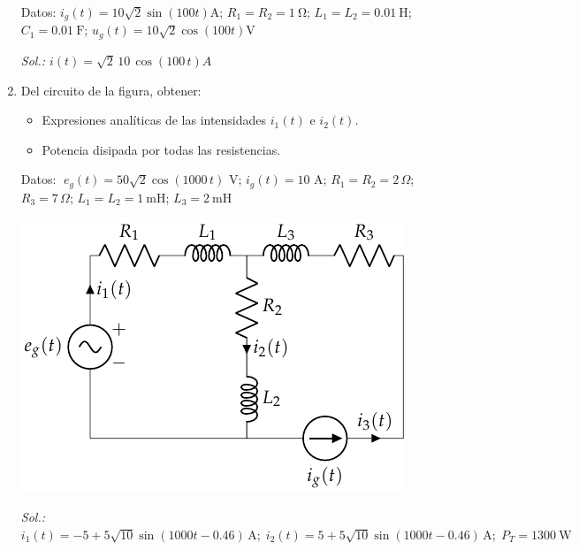 \begin{enumerate}
Datos: $i_g(t) = 10\sqrt{2}\sin(100t)\unit{\ampere}$; $R_1 = R_2 = \qty{1}{\ohm}$; $L_1 = L_2 = \qty{0.01}{\henry}$; $C_1 = \qty{0.01}{\farad}$; $u_g(t) = 10\sqrt{2}\cos(100t)\unit{\volt}$


  \emph{Sol.: $i(t)=\sqrt{2}\,10\,\cos(100\,t) A$}

\item Del circuito de la figura, obtener:
  \begin{itemize}
  \item Expresiones analíticas de las intensidades $i_1(t)$ e $i_2(t)$.
  \item Potencia disipada por todas las resistencias.
  \end{itemize}

  Datos: $\; e_g(t)=50\sqrt{2} \cos(1000\,t)$ V; \hspace{2mm}$i_g(t)=10$ A; \hspace{2mm}
$R_1=R_2=2\,\Omega$; \hspace{2mm} $R_3=7\,\Omega$; \hspace{2mm} $L_1=L_2=\qty{1}{\milli\henry}$; \hspace{2mm} $L_3=\qty{2}{\milli\henry}$
  \begin{center}
    \includegraphics{../figs/ej18_BT2.pdf}
  \end{center}
  \emph{Sol.:\; 
    $i_1(t)= -5+5\sqrt{10}\sin(1000t-0.46) \,\si{\ampere};\; i_2(t)=
    5+5\sqrt{10}\sin(1000t-0.46) \,\si{\ampere};\; P_T=\qty{1300}{\watt}$}


\end{enumerate}
